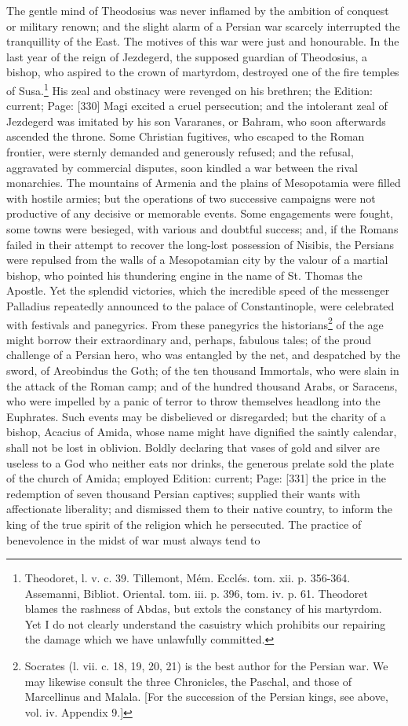 The gentle mind of Theodosius was never inflamed by the ambition of conquest or military renown; and the slight alarm of a Persian war scarcely interrupted the tranquillity of the East. The motives of this war were just and honourable. In the last year of the reign of Jezdegerd, the supposed guardian of Theodosius, a bishop, who aspired to the crown of martyrdom, destroyed one of the fire temples of Susa.\footnote{Theodoret, l. v. c. 39. Tillemont, Mém. Ecclés. tom. xii. p. 356-364. Assemanni, Bibliot. Oriental. tom. iii. p. 396, tom. iv. p. 61. Theodoret blames the rashness of Abdas, but extols the constancy of his martyrdom. Yet I do not clearly understand the casuistry which prohibits our repairing the damage which we have unlawfully committed.} His zeal and obstinacy were revenged on his brethren; the Edition: current; Page: [330] Magi excited a cruel persecution; and the intolerant zeal of Jezdegerd was imitated by his son Vararanes, or Bahram, who soon afterwards ascended the throne. Some Christian fugitives, who escaped to the Roman frontier, were sternly demanded and generously refused; and the refusal, aggravated by commercial disputes, soon kindled a war between the rival monarchies. The mountains of Armenia and the plains of Mesopotamia were filled with hostile armies; but the operations of two successive campaigns were not productive of any decisive or memorable events. Some engagements were fought, some towns were besieged, with various and doubtful success; and, if the Romans failed in their attempt to recover the long-lost possession of Nisibis, the Persians were repulsed from the walls of a Mesopotamian city by the valour of a martial bishop, who pointed his thundering engine in the name of St. Thomas the Apostle. Yet the splendid victories, which the incredible speed of the messenger Palladius repeatedly announced to the palace of Constantinople, were celebrated with festivals and panegyrics. From these panegyrics the historians\footnote{Socrates (l. vii. c. 18, 19, 20, 21) is the best author for the Persian war. We may likewise consult the three Chronicles, the Paschal, and those of Marcellinus and Malala. [For the succession of the Persian kings, see above, vol. iv. Appendix 9.]} of the age might borrow their extraordinary and, perhaps, fabulous tales; of the proud challenge of a Persian hero, who was entangled by the net, and despatched by the sword, of Areobindus the Goth; of the ten thousand Immortals, who were slain in the attack of the Roman camp; and of the hundred thousand Arabs, or Saracens, who were impelled by a panic of terror to throw themselves headlong into the Euphrates. Such events may be disbelieved or disregarded; but the charity of a bishop, Acacius of Amida, whose name might have dignified the saintly calendar, shall not be lost in oblivion. Boldly declaring that vases of gold and silver are useless to a God who neither eats nor drinks, the generous prelate sold the plate of the church of Amida; employed Edition: current; Page: [331] the price in the redemption of seven thousand Persian captives; supplied their wants with affectionate liberality; and dismissed them to their native country, to inform the king of the true spirit of the religion which he persecuted. The practice of benevolence in the midst of war must always tend to 